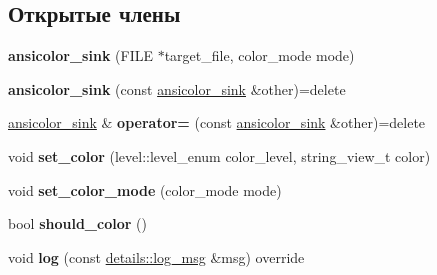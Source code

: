 \subsection*{Открытые члены}
\begin{DoxyCompactItemize}
\item 
\mbox{\label{classspdlog_1_1sinks_1_1ansicolor__sink_aad4469ea28e9da2c1a36bb1c03155580}} 
{\bfseries ansicolor\+\_\+sink} (F\+I\+LE $\ast$target\+\_\+file, color\+\_\+mode mode)
\item 
\mbox{\label{classspdlog_1_1sinks_1_1ansicolor__sink_a5d4fccd9f3075cfda89116ffc67856ef}} 
{\bfseries ansicolor\+\_\+sink} (const \hyperlink{classspdlog_1_1sinks_1_1ansicolor__sink}{ansicolor\+\_\+sink} \&other)=delete
\item 
\mbox{\label{classspdlog_1_1sinks_1_1ansicolor__sink_a9b866ae10a8aa3f1777d6fbefef7b481}} 
\hyperlink{classspdlog_1_1sinks_1_1ansicolor__sink}{ansicolor\+\_\+sink} \& {\bfseries operator=} (const \hyperlink{classspdlog_1_1sinks_1_1ansicolor__sink}{ansicolor\+\_\+sink} \&other)=delete
\item 
\mbox{\label{classspdlog_1_1sinks_1_1ansicolor__sink_a42fc1c794bfdf9acd2b10dbf21ff65ed}} 
void {\bfseries set\+\_\+color} (level\+::level\+\_\+enum color\+\_\+level, string\+\_\+view\+\_\+t color)
\item 
\mbox{\label{classspdlog_1_1sinks_1_1ansicolor__sink_a6d85b9def8a6d0fcaa91ce89bb442f21}} 
void {\bfseries set\+\_\+color\+\_\+mode} (color\+\_\+mode mode)
\item 
\mbox{\label{classspdlog_1_1sinks_1_1ansicolor__sink_a50bbda6eb88a4245a95c1e0d10f8e108}} 
bool {\bfseries should\+\_\+color} ()
\item 
\mbox{\label{classspdlog_1_1sinks_1_1ansicolor__sink_ad501114de1f3cae065d57740731f767f}} 
void {\bfseries log} (const \hyperlink{structspdlog_1_1details_1_1log__msg}{details\+::log\+\_\+msg} \&msg) override
\item 

\end{DoxyCompactItemize}
